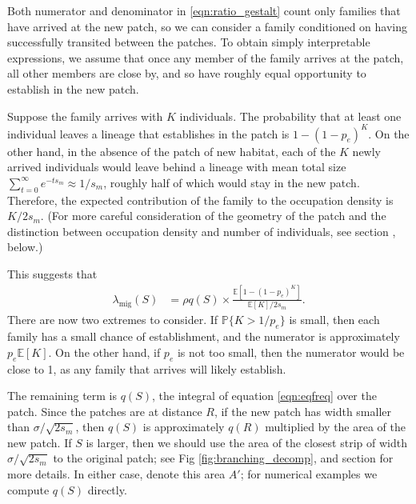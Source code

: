 \documentclass[10pt,letterpaper]{article}
\renewcommand{\P}{\mathbb{P}}
\newcommand{\E}{\mathbb{E}}
\newcommand{\migrate}{\lambda_\text{mig}}
\newcommand{\secref}[1]{{\emph{\nameref{#1}}}}
\begin{document}
Both numerator and denominator in \eqref{eqn:ratio_gestalt} 
count only families that have arrived at the new patch,
so we can consider a family conditioned on having successfully transited between the patches.
To obtain simply interpretable expressions,
we assume that once any member of the family arrives at the patch,
all other members are close by, and so have roughly equal opportunity
to establish in the new patch.

Suppose the family arrives with $K$ individuals.
The probability that at least one individual leaves a lineage that establishes in the patch
is $1-(1-p_e)^K$.
On the other hand, in the absence of the patch of new habitat,
each of the $K$ newly arrived individuals would leave behind a lineage with 
mean total size $\sum_{t=0}^\infty e^{-t s_m} \approx 1/s_m$,
roughly half of which would stay in the new patch.
Therefore, the expected contribution of the family to the occupation density is $K/2s_m$.
(For more careful consideration of the geometry of the patch
and the distinction between occupation density and number of individuals,
see section \secref{ss:hitting_occupation}, below.)

This suggests that 
\begin{align} \label{eqn:ratio_K}
  \migrate(S) 
    &= \rho q(S) \times 
    \frac{
        \E[1-(1-p_e)^K]
    }{
        \E[K]/2s_m
    } .
\end{align}
There are now two extremes to consider.
If $\P\{K>1/p_e\}$ is small, then each family has a small chance of establishment,
and the numerator is approximately $p_e \E[K]$.
On the other hand, if $p_e$ is not too small,
then the numerator would be close to 1, as any family that arrives will likely establish.

The remaining term is $q(S)$, the integral of equation \eqref{eqn:eqfreq} over the patch.
Since the patches are at distance $R$,
if the new patch has width smaller than $\sigma/\sqrt{2s_m}$, 
then $q(S)$ is approximately $q(R)$ multiplied by the area of the new patch.
If $S$ is larger, then we should use the area of the closest strip
of width $\sigma/\sqrt{2s_m}$ to the original patch;
see Fig \ref{fig:branching_decomp}, and section \secref{apx:qS} for more details.
In either case, denote this area $A'$;
for numerical examples we compute $q(S)$ directly.
\end{document}
